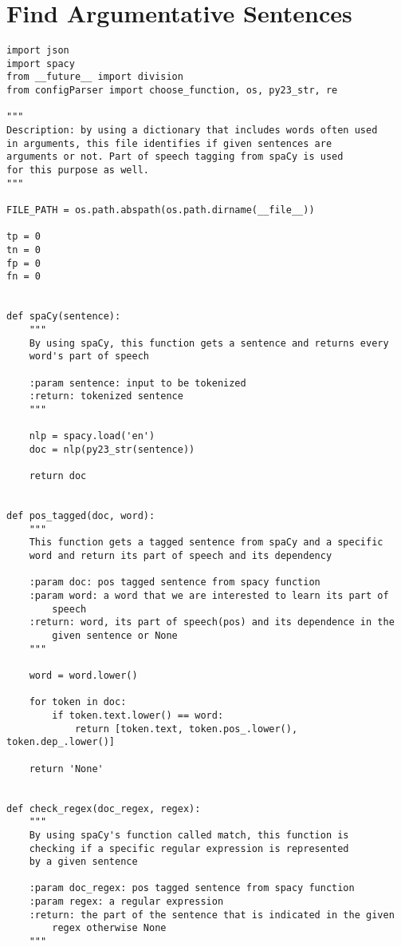
\chapter{Find Argumentative Sentences}

\label{Appendix8}

\begin{lstlisting}[language=iPython]
import json
import spacy
from __future__ import division
from configParser import choose_function, os, py23_str, re

"""
Description: by using a dictionary that includes words often used 
in arguments, this file identifies if given sentences are 
arguments or not. Part of speech tagging from spaCy is used 
for this purpose as well.
"""

FILE_PATH = os.path.abspath(os.path.dirname(__file__))

tp = 0
tn = 0
fp = 0
fn = 0


def spaCy(sentence):
	"""
	By using spaCy, this function gets a sentence and returns every
	word's part of speech
	
	:param sentence: input to be tokenized
	:return: tokenized sentence
	"""
	
	nlp = spacy.load('en')
	doc = nlp(py23_str(sentence))
	
	return doc


def pos_tagged(doc, word):
	"""
	This function gets a tagged sentence from spaCy and a specific 
	word and return its part of speech and its dependency
	
	:param doc: pos tagged sentence from spacy function
	:param word: a word that we are interested to learn its part of 
		speech
	:return: word, its part of speech(pos) and its dependence in the
		given sentence or None
	"""
	
	word = word.lower()
	
	for token in doc:
		if token.text.lower() == word:
			return [token.text, token.pos_.lower(), token.dep_.lower()]
	
	return 'None'


def check_regex(doc_regex, regex):
	"""
	By using spaCy's function called match, this function is
	checking if a specific regular expression is represented
	by a given sentence
	
	:param doc_regex: pos tagged sentence from spacy function
	:param regex: a regular expression
	:return: the part of the sentence that is indicated in the given
		regex otherwise None
	"""
	

\end{lstlisting}
